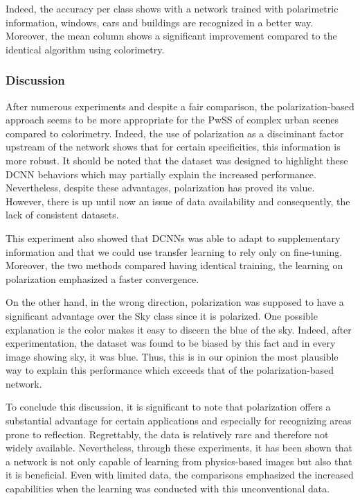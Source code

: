 Indeed, the accuracy per class shows with a network trained with polarimetric information, windows, cars and buildings are recognized in a better way. Moreover, the mean column shows a significant improvement compared to the identical algorithm using colorimetry.


\subsubsection{Discussion}

After numerous experiments and despite a fair comparison, the polarization-based approach seems to be more appropriate for the PwSS of complex urban scenes compared to colorimetry. Indeed, the use of polarization as a disciminant factor upstream of the network shows that for certain specificities, this information is more robust. 
It should be noted that the dataset was designed to highlight these DCNN behaviors which may partially explain the increased performance. Nevertheless, despite these advantages, polarization has proved its value. However, there is up until now an issue of data availability and consequently, the lack of consistent datasets.

This experiment also showed that DCNNs was able to adapt to supplementary information and that we could use transfer learning to rely only on fine-tuning. Moreover, the two methods compared having identical training, the learning on polarization emphasized a faster convergence. 

On the other hand, in the wrong direction, polarization was supposed to have a significant advantage over the Sky class since it is polarized. One possible explanation is the color makes it easy to discern the blue of the sky. Indeed, after experimentation, the dataset was found to be biased by this fact and in every image showing sky, it was blue. Thus, this is in our opinion the most plausible way to explain this performance which exceeds that of the polarization-based network.

To conclude this discussion, it is significant to note that polarization offers a substantial advantage for certain applications and especially for recognizing areas prone to reflection. Regrettably, the data is relatively rare and therefore not widely available. Nevertheless, through these experiments, it has been shown that a network is not only capable of learning from physics-based images but also that it is beneficial. Even with limited data, the comparisons emphasized the increased capabilities when the learning was conducted with this unconventional data.

